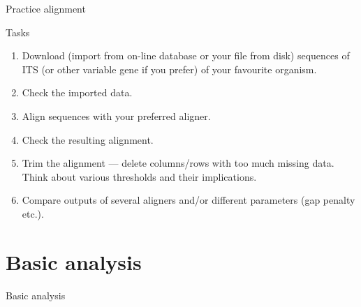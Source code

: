 \documentclass[compress, ucs, xelatex, 11pt, xcolor=svgnames, aspectratio=169,
	hyperref={
		bookmarks=true,
		unicode=true,
		colorlinks=true,
		pdftitle={Molecular data in R},
		plainpages=false,
		pdfauthor={Vojtech Zeisek},
		pdfsubject={Course about phylogeny and evolution in R},
		pdfcreator={XeLaTeX},
		pdfkeywords={R, evolution, phylogeny, molecular data},
		linkcolor=Crimson, %
		anchorcolor=Magenta, %
		citecolor=Magenta, %
		filecolor=Magenta, %
		menucolor=Magenta, %
		urlcolor=DodgerBlue, %
		pdftex},
	url={hyphens, lowtilde} %
	]{beamer}
\begin{document}
\begin{frame}[fragile]{Practice alignment}
	\begin{exampleblock}{Tasks}
		\begin{enumerate}
			\item Download (import from on-line database or your file from disk) sequences of ITS (or other variable gene if you prefer) of your favourite organism.
			\item Check the imported data.
			\item Align sequences with your preferred aligner.
			\item Check the resulting alignment.
			\item Trim the alignment --- delete columns/rows with too much missing data. Think about various thresholds and their implications.
			\item Compare outputs of several aligners and/or different parameters (gap penalty etc.).
		\end{enumerate}
	\end{exampleblock}
\end{frame}

\section{Basic analysis}

\begin{frame}{Basic analysis}
	\tableofcontents[currentsection, sectionstyle=show/hide, hideothersubsections]
\end{frame}
\end{document}
